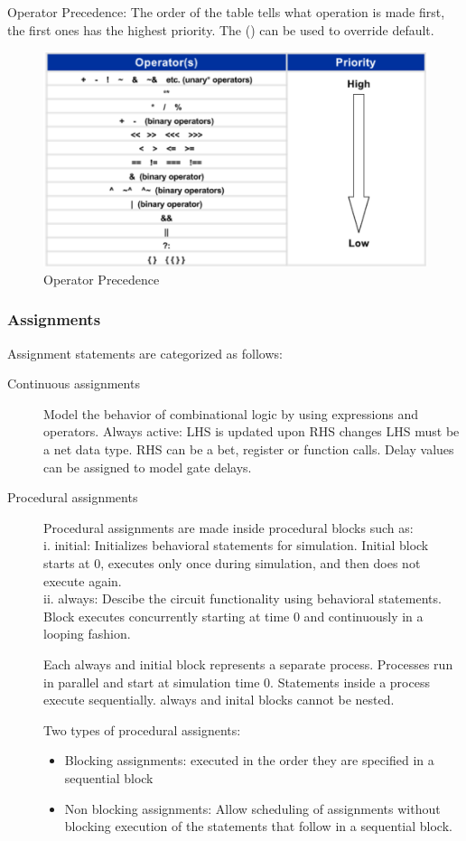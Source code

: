 Operator Precedence:
The order of the table tells what operation is made first, the first ones has the highest priority. The () can be used to override default. 
\begin{figure}[H]
	\begin{center}
		\includegraphics[width=5in]{images/OperatorPrecedence.png}
		\caption{Operator Precedence}
		\label{OperatorPrecedence}
	\end{center}
\end{figure}


\subsubsection{Assignments}
Assignment statements are categorized as follows:
\begin{description}
\item[Continuous assignments] Model the behavior of combinational logic by using expressions and operators. 
Always active: LHS is updated upon RHS changes
LHS must be a net data type.
RHS can be a bet, register or function calls.
Delay values can be assigned to model gate delays.


\item[Procedural assignments] Procedural assignments are made inside procedural blocks such as:\\
i. initial: Initializes behavioral statements for simulation. Initial block starts at 0, executes only once during simulation, and then does not execute again.\\
ii. always: Descibe the circuit functionality using behavioral statements. Block executes concurrently starting at time 0 and continuously in a looping fashion.

\par Each always and initial block represents a separate process. Processes run in parallel and start at simulation time 0. Statements inside a process execute sequentially. always and inital blocks cannot be nested.

Two types of procedural assignents:
\begin{itemize}
    \item Blocking assignments: executed in the order they are specified in a sequential block
    \item Non blocking assignments: Allow scheduling of assignments without blocking execution of  the statements that follow in a sequential block.
\end{itemize}

\end{description}

